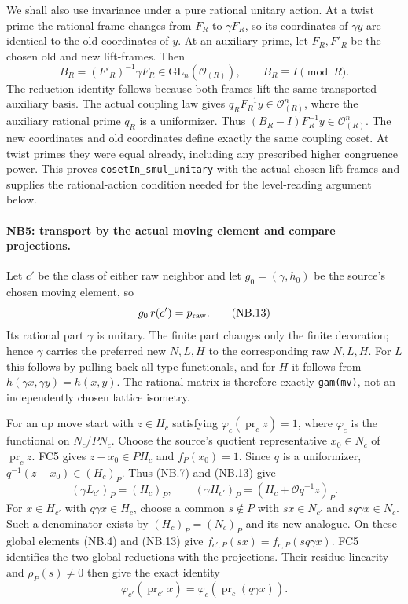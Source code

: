 \documentclass[11pt,a4paper]{article}
\numberwithin{equation}{section}
\theoremstyle{remark}\newtheorem{remark}[theorem]{Remark}
\begin{document}
We shall also use invariance under a pure rational unitary action.
At a twist prime the rational frame changes from $F_R$ to $\gamma F_R$,
so its coordinates of $\gamma y$ are identical to the old coordinates
of $y$. At an auxiliary prime, let $F_R,F'_R$ be the chosen old and
new lift-frames. Then
\[
 B_R=(F'_R)^{-1}\gamma F_R\in\mathrm{GL}_n(\mathcal O_{(R)}),
 \qquad B_R\equiv I\pmod R.                          \tag{NB.12}
\]
The reduction identity follows because both frames lift the same
transported auxiliary basis. The actual coupling law gives
$q_R F_R^{-1}y\in\mathcal O_{(R)}^n$, where the auxiliary rational
prime $q_R$ is a uniformizer. Thus
$(B_R-I)F_R^{-1}y\in\mathcal O_{(R)}^n$. The new coordinates and old
coordinates define exactly the same coupling coset. At twist primes
they were equal already, including any prescribed higher congruence
power. This proves \texttt{cosetIn\_\allowbreak smul\_\allowbreak unitary} with the actual
chosen lift-frames and supplies the rational-action condition needed
for the level-reading argument below.

\paragraph{NB5: transport by the actual moving element and compare projections.}
Let $c'$ be the class of either raw neighbor and let
$g_0=(\gamma,h_0)$ be the source's chosen moving element, so
\[
                      g_0\,r(c')=p_{\rm raw}.        \tag{NB.13}
\]
Its rational part $\gamma$ is unitary. The finite part changes only
the finite decoration; hence $\gamma$ carries the preferred new
$N,L,H$ to the corresponding raw $N,L,H$. For $L$ this follows by
pulling back all type functionals, and for $H$ it follows from
$h(\gamma x,\gamma y)=h(x,y)$. The rational matrix is therefore
exactly \texttt{gam(mv)}, not an independently chosen lattice isometry.

For an up move start with $z\in H_c$ satisfying
$\varphi_c(\operatorname{pr}_c z)=1$, where $\varphi_c$ is the
functional on $N_c/PN_c$. Choose the source's quotient representative
$x_0\in N_c$ of $\operatorname{pr}_c z$. FC5 gives
$z-x_0\in PH_c$ and $f_P(x_0)=1$. Since $q$ is a uniformizer,
$q^{-1}(z-x_0)\in(H_c)_P$. Thus (NB.7) and (NB.13) give
\[
 (\gamma L_{c'})_P=(H_c)_P,\qquad
 (\gamma H_{c'})_P=(H_c+\mathcal Oq^{-1}z)_P.         \tag{NB.14}
\]
For $x\in H_{c'}$ with $q\gamma x\in H_c$, choose a common
$s\notin P$ with $sx\in N_{c'}$ and $sq\gamma x\in N_c$.
Such a denominator exists by $(H_c)_P=(N_c)_P$ and its new analogue.
On these global elements (NB.4) and (NB.13) give
$f_{c',P}(sx)=f_{c,P}(sq\gamma x)$. FC5 identifies the two global
reductions with the projections. Their residue-linearity and
$\rho_P(s)\ne0$ then give the exact identity
\[
 \varphi_{c'}(\operatorname{pr}_{c'}x)
       =\varphi_c(\operatorname{pr}_c(q\gamma x)).    \tag{NB.15}
\]
\end{document}
